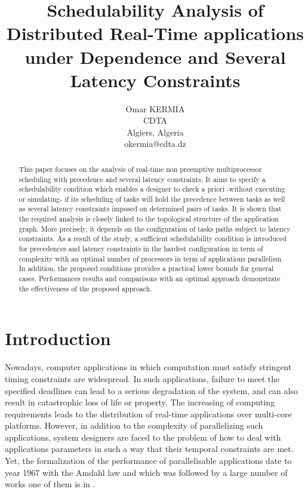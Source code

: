 \documentclass{ijcaArticle}
\begin{document}
\title{Schedulability Analysis of Distributed Real-Time applications under Dependence and Several Latency Constraints}


\author{ 
   \large Omar KERMIA \\[-3pt]
   \normalsize CDTA  \\[-3pt]
    \normalsize Algiers, Algeria \\[-3pt]
    \normalsize okermia@cdta.dz \\[-3pt]
   }


\maketitle

\begin{abstract}
This paper focuses on the analysis of  real-time non
 preemptive multiprocessor scheduling with
precedence and several latency constraints.
 It aims to specify a schedulability condition which 
 enables a designer to check a priori -without executing or simulating-
  if its scheduling of
tasks will hold the precedence between tasks as well as several latency constraints imposed on determined pairs of tasks. 
It is shown that the required analysis is closely linked to the topological structure of the application graph. More precisely, it depends on the
configuration of tasks paths subject to latency constraints.
As a result of the study, a sufficient schedulability condition is introduced for precedences and latency constraints in the hardest configuration in term of complexity with an optimal number of processors in term of applications parallelism. In addition, the proposed conditions provides a practical lower bounds for general cases.  
Performances results and  comparisons with an optimal approach demonstrate the effectiveness of the proposed approach.   
\end{abstract}




\section{Introduction}
\label{}
Nowadays, computer applications in which computation must satisfy stringent timing constraints are widespread. In such applications, failure to meet the specified
deadlines can lead to a serious degradation of the system, and can also result in catastrophic loss of life or property. The increasing of computing requirements leads to the distribution 
of real-time applications over multi-core platforms. However, in addition to the complexity of parallelizing such applications, system designers  are faced to the problem of how to deal with applications parameters in such a way that their temporal constraints are met. Yet, the formalization of the performance of parallelisable applications date to year 1967 with the Amdahl law \cite{Amdahl67} and which was followed by a large number of works one of them is in \cite{Shi1996}.      
\end{document}
